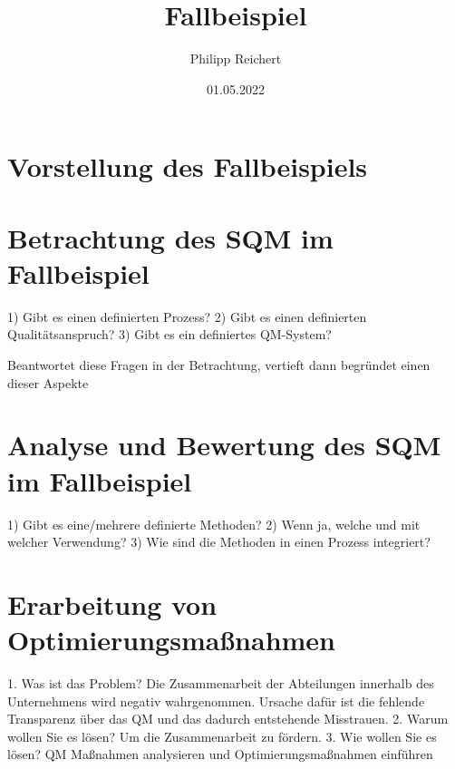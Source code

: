 \documentclass[12pt]{article}
\begin{document}
\title{Fallbeispiel}
\date{01.05.2022}
\author{Philipp Reichert}

\maketitle

\section{Vorstellung des Fallbeispiels}



\section{Betrachtung des SQM im Fallbeispiel}

1) Gibt es einen definierten Prozess?
2) Gibt es einen definierten Qualitätsanspruch?
3) Gibt es ein definiertes QM-System?

Beantwortet diese Fragen in der Betrachtung, vertieft dann begründet einen dieser Aspekte

\section{Analyse und Bewertung des SQM im Fallbeispiel}

1) Gibt es eine/mehrere definierte Methoden?
2) Wenn ja, welche und mit welcher Verwendung?
3) Wie sind die Methoden in einen Prozess integriert?

\section{Erarbeitung von Optimierungsmaßnahmen}

1. Was ist das Problem?
Die Zusammenarbeit der Abteilungen innerhalb des Unternehmens wird negativ
wahrgenommen. Ursache dafür ist die fehlende Transparenz über das QM und das dadurch
entstehende Misstrauen.
2. Warum wollen Sie es lösen?
Um die Zusammenarbeit zu fördern.
3. Wie wollen Sie es lösen?
QM Maßnahmen analysieren und Optimierungsmaßnahmen einführen
\end{document}
